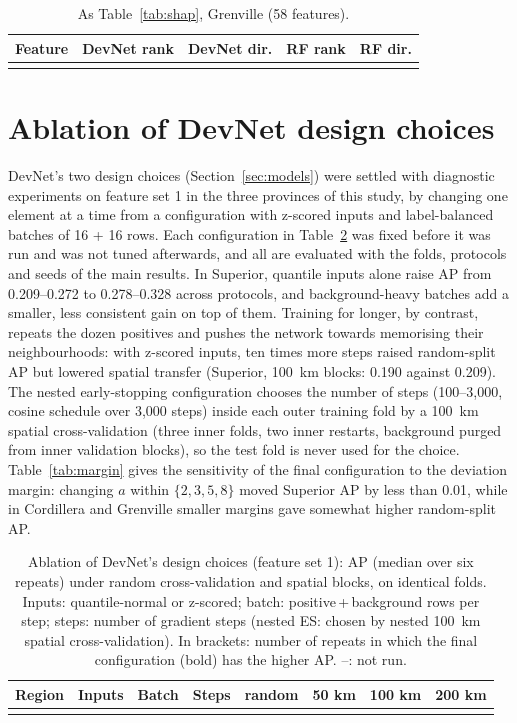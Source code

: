 \documentclass[pdflatex,sn-apa]{sn-jnl}
\begin{document}
\begin{appendices}
\begin{table}[!h]
\caption{As Table~\ref{tab:shap}, Grenville (58 features).}\label{tab:shap-gren}
\footnotesize
\begin{tabular*}{\textwidth}{@{\extracolsep\fill}lcccc}
\toprule
Feature & DevNet rank & DevNet dir. & RF rank & RF dir. \\
\midrule
\botrule
\end{tabular*}
\end{table}

\clearpage
\section{Ablation of DevNet design choices}\label{app:sensitivity}

DevNet's two design choices (Section~\ref{sec:models}) were settled with diagnostic experiments on feature set 1 in the three provinces of this study, by changing one element at a time from a configuration with z-scored inputs and label-balanced batches of 16 + 16 rows. Each configuration in Table~\ref{tab:ablation} was fixed before it was run and was not tuned afterwards, and all are evaluated with the folds, protocols and seeds of the main results. In Superior, quantile inputs alone raise AP from 0.209--0.272 to 0.278--0.328 across protocols, and background-heavy batches add a smaller, less consistent gain on top of them. Training for longer, by contrast, repeats the dozen positives and pushes the network towards memorising their neighbourhoods: with z-scored inputs, ten times more steps raised random-split AP but lowered spatial transfer (Superior, 100~km blocks: 0.190 against 0.209). The nested early-stopping configuration chooses the number of steps (100--3,000, cosine schedule over 3,000 steps) inside each outer training fold by a 100~km spatial cross-validation (three inner folds, two inner restarts, background purged from inner validation blocks), so the test fold is never used for the choice. Table~\ref{tab:margin} gives the sensitivity of the final configuration to the deviation margin: changing $a$ within $\{2, 3, 5, 8\}$ moved Superior AP by less than 0.01, while in Cordillera and Grenville smaller margins gave somewhat higher random-split AP.

\begin{table}[!h]
\caption{Ablation of DevNet's design choices (feature set 1): AP (median over six repeats) under random cross-validation and spatial blocks, on identical folds. Inputs: quantile-normal or z-scored; batch: positive\,+\,background rows per step; steps: number of gradient steps (nested ES: chosen by nested 100~km spatial cross-validation). In brackets: number of repeats in which the final configuration (bold) has the higher AP. --: not run.}\label{tab:ablation}
\scriptsize
\setlength{\tabcolsep}{2.5pt}
\begin{tabular*}{\textwidth}{@{\extracolsep\fill}llllllll}
\toprule
Region & Inputs & Batch & Steps & random & 50 km & 100 km & 200 km \\
\midrule
\botrule
\end{tabular*}
\end{table}


\end{appendices}
\end{document}
